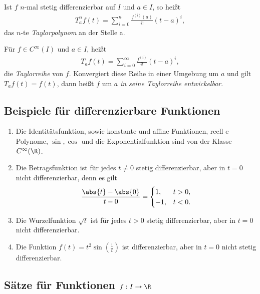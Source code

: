\begin{defn}
Ist $f$ $n$-mal stetig differenzierbar auf $I$ und $a\in I$, so heißt
\begin{align*}
T_a^n f(t) = \sum\limits_{i=0}^{n}\frac{f^{(i)}(a)}{i!}(t-a)^i,
\end{align*}
das $n$-te \emph{Taylorpolynom} an der Stelle a.
\end{defn}
\begin{defn}
Für $f\in C^\infty(I)$ und $a\in I$, heißt
\begin{align*}
T_a f(t) = \sum\limits_{i=0}^\infty \frac{f^{(i)}}{i!}(t-a)^i,
\end{align*}
die \emph{Taylorreihe} von $f$. Konvergiert diese Reihe in einer Umgebung um $a$
und gilt $T_a f(t) = f(t)$, dann heißt $f$ um $a$ \emph{in seine Taylorreihe
entwickelbar}.
\end{defn}

\subsection{Beispiele für differenzierbare Funktionen}

\begin{enumerate}
  \item Die Identitätsfunktion, sowie konstante und affine Funktionen, reell
 e Polynome, $\sin,\cos$ und die Exponentialfunktion sind von der Klasse
 $C^\infty(\R)$.
  \item Die Betragsfunktion ist für jedes $t\neq 0$ stetig differenzierbar, aber
  in $t=0$ nicht differenzierbar, denn es gilt
  \begin{align*}
  \frac{\abs{t}-\abs{0}}{t-0} = \begin{cases}1,& t > 0,\\-1, & t < 0.\end{cases}
  \end{align*}
  \item Die Wurzelfunktion $\sqrt{t}$ ist für jedes $t > 0$
  stetig differenzierbar, aber in $t=0$ nicht differenzierbar.
  \item Die Funktion $f(t) = t^2\sin(\frac{1}{t})$ ist differenzierbar, aber in
  $t=0$ nicht stetig differenzierbar.
\end{enumerate}

\subsection{Sätze für Funktionen $f: I\to\R$}

